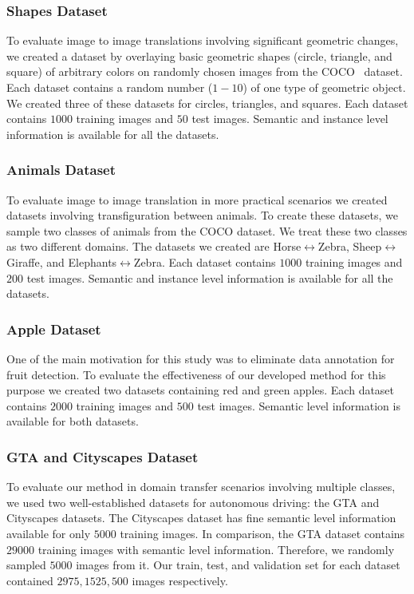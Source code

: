  \subsubsection{Shapes Dataset}
 To evaluate image to image translations involving significant geometric changes, we created a dataset by overlaying basic geometric shapes (circle, triangle, and square) of arbitrary colors on randomly chosen images from the COCO~\cite{lin2014microsoft} dataset. Each dataset contains a random number ($1-10$) of one type of geometric object. We created three of these datasets for circles, triangles, and squares. Each dataset contains $1000$ training images and $50$ test images. Semantic and instance level information is available for all the datasets.
 
 \subsubsection{Animals Dataset}
 To evaluate image to image translation in more practical scenarios we created datasets involving transfiguration between animals. To create these datasets, we sample two classes of animals from the COCO dataset. We treat these two classes as two different domains. The datasets we created are Horse$\leftrightarrow$Zebra, Sheep$\leftrightarrow$Giraffe, and Elephants$\leftrightarrow$Zebra. Each dataset contains $1000$ training images and $200$ test images. Semantic and instance level information is available for all the datasets.
 
 
 \subsubsection{Apple Dataset}
 One of the main motivation for this study was to eliminate data annotation for fruit detection. To evaluate the effectiveness of our developed method for this purpose we created two datasets containing red and green apples. Each dataset contains $2000$ training images and $500$ test images. Semantic level information is available for both datasets. 
 
 \subsubsection{GTA and Cityscapes Dataset}
 To evaluate our method in domain transfer scenarios involving multiple classes, we used two well-established datasets for autonomous driving: the GTA and Cityscapes datasets. The Cityscapes dataset has fine semantic level information available for only $5000$ training images. In comparison, the GTA dataset contains $29000$ training images with semantic level information. Therefore, we randomly sampled $5000$ images from it. Our train, test, and validation set for each dataset contained $2975,1525, 500$ images respectively.


